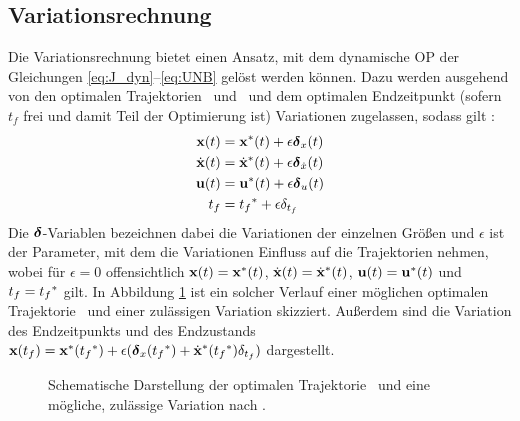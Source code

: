 \subsection{Variationsrechnung}\label{subsec:Variationsrechnung}
Die Variationsrechnung bietet einen Ansatz, mit dem dynamische \gls{OP} der Gleichungen \eqref{eq:J_dyn}--\eqref{eq:UNB} gelöst werden können. Dazu werden ausgehend von den optimalen Trajektorien \xoptoft~und \uoptoft~und dem optimalen Endzeitpunkt  (sofern $t_f$ frei und damit Teil der Optimierung ist) Variationen zugelassen, sodass gilt \cite{KnutGraichen.2012}:
\begin{align}
\boldsymbol{\mathrm{x}}(t) &= {\boldsymbol{\mathrm{x}}}^*(t) + \epsilon\boldsymbol{\mathrm{\delta}}_{x}(t) \label{eq:x_var}\\
\dot{\boldsymbol{\mathrm{x}}}(t) &= \dot{\boldsymbol{\mathrm{x}}}^*(t) + \epsilon\boldsymbol{\mathrm{\delta}}_{\dot{x}}(t) \label{eq:dx_var}\\
\boldsymbol{\mathrm{u}}(t) &= {\boldsymbol{\mathrm{u}}}^*(t) + \epsilon\boldsymbol{\mathrm{\delta}}_{u}(t) \label{eq:u_var}\\
t_f &= {t_f}^* + \epsilon\delta_{t_f}\label{eq:t_var}
\end{align}
Die $\boldsymbol{\mathrm{\delta}}$-Variablen bezeichnen dabei die Variationen der einzelnen Größen und $\epsilon$ ist der Parameter, mit dem die Variationen Einfluss auf die Trajektorien nehmen, wobei für $\epsilon=0$ offensichtlich $\boldsymbol{\mathrm{x}}(t)={\boldsymbol{\mathrm{x}}}^*(t)$, $\dot{\boldsymbol{\mathrm{x}}}(t) = \dot{\boldsymbol{\mathrm{x}}}^*(t)$, $\boldsymbol{\mathrm{u}}(t)={\boldsymbol{\mathrm{u}}}^*(t)$ und $t_f={t_f}^*$ gilt. In Abbildung \ref{fig:Variation} ist ein solcher Verlauf einer möglichen optimalen Trajektorie \xoptoft~und einer zulässigen Variation skizziert. Außerdem sind die Variation des Endzeitpunkts und des Endzustands $\boldsymbol{\mathrm{x}}(t_f) = {\boldsymbol{\mathrm{x}}}^*({t_f}^*)+\epsilon(\boldsymbol{\mathrm{\delta}}_{x}({t_f}^*)+\dot{\boldsymbol{\mathrm{x}}}^*({t_f}^*)\delta_{t_f})$ dargestellt.
\begin{figure}[h]
\centering
{}
\caption{Schematische Darstellung der optimalen Trajektorie \xoptoft~und eine mögliche, zulässige Variation \xoft nach \cite{KnutGraichen.2012}.}
\label{fig:Variation}
\end{figure}

